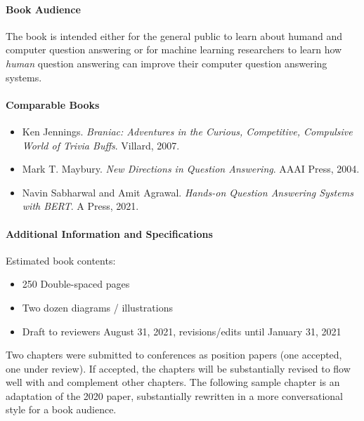 \paragraph{Book Audience}

The book is intended either for the general public to learn about humand and computer
question answering or for machine learning researchers to learn
how \emph{human} question answering can improve their computer question
answering systems.

\paragraph{Comparable Books}

\begin{itemize}
        \item Ken Jennings.  \textit{Braniac: Adventures in the Curious,
        Competitive, Compulsive World of Trivia Buffs}.  Villard, 2007.

        \item Mark T. Maybury.  \textit{New Directions in Question
        Answering}.  AAAI Press, 2004.

        \item Navin Sabharwal and Amit Agrawal.  \textit{Hands-on Question
        Answering Systems with BERT}.  A Press, 2021.
\end{itemize}


\paragraph{Additional Information and Specifications}

Estimated book contents:
\begin{itemize}
  \item 250 Double-spaced pages
  \item Two dozen diagrams / illustrations
  \item Draft to reviewers August 31, 2021, revisions/edits until
    January 31, 2021
\end{itemize}

Two chapters were submitted to conferences as position papers (one
accepted, one under review).  If accepted, the chapters will be
substantially revised to flow well with and complement other
chapters.  The following sample chapter is an adaptation of the 2020 
paper, substantially rewritten in a more conversational style for a
book audience.
